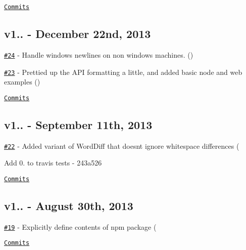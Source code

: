 \href{https://github.com/kpdecker/jsdiff/compare/v1.0.8...v1.1.0}{\tt Commits}

\subsection*{v1.. -\/ December 22nd, 2013}


\begin{DoxyItemize}
\item \href{https://github.com/kpdecker/jsdiff/pull/24}{\tt \#24} -\/ Handle windows newlines on non windows machines. (\href{https://api.github.com/users/benogle}{\tt })
\item \href{https://github.com/kpdecker/jsdiff/pull/23}{\tt \#23} -\/ Prettied up the A\+PI formatting a little, and added basic node and web examples (\href{https://api.github.com/users/airportyh}{\tt })
\end{DoxyItemize}

\href{https://github.com/kpdecker/jsdiff/compare/v1.0.7...v1.0.8}{\tt Commits}

\subsection*{v1.. -\/ September 11th, 2013}


\begin{DoxyItemize}
\item \href{https://github.com/kpdecker/jsdiff/pull/22}{\tt \#22} -\/ Added variant of Word\+Diff that doesn\textquotesingle{}t ignore whitespace differences (\href{https://api.github.com/users/papandreou}{\tt }
\item Add 0. to travis tests -\/ 243a526
\end{DoxyItemize}

\href{https://github.com/kpdecker/jsdiff/compare/v1.0.6...v1.0.7}{\tt Commits}

\subsection*{v1.. -\/ August 30th, 2013}


\begin{DoxyItemize}
\item \href{https://github.com/kpdecker/jsdiff/pull/19}{\tt \#19} -\/ Explicitly define contents of npm package (\href{https://api.github.com/users/sindresorhus}{\tt }
\end{DoxyItemize}

\href{https://github.com/kpdecker/jsdiff/compare/v1.0.5...v1.0.6}{\tt Commits} 
